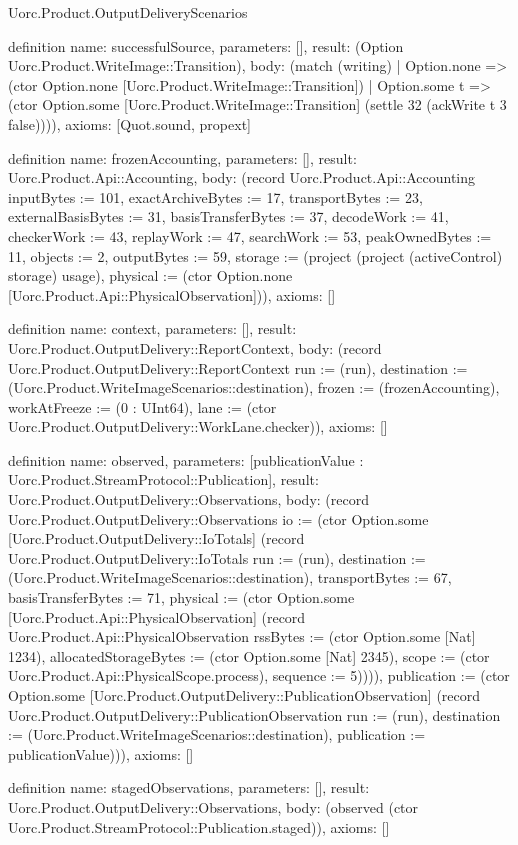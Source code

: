 \begin{lexlean}{Uorc.Product.OutputDeliveryScenarios}
\begin{semanticmodule}
definition{
  name: successfulSource,
  parameters: [],
  result: (Option Uorc.Product.WriteImage::Transition),
  body: (match (writing)
    | Option.none => (ctor Option.none [Uorc.Product.WriteImage::Transition])
    | Option.some t => (ctor Option.some [Uorc.Product.WriteImage::Transition] (settle 32 (ackWrite t 3 false)))),
  axioms: [Quot.sound, propext]
}

definition{
  name: frozenAccounting,
  parameters: [],
  result: Uorc.Product.Api::Accounting,
  body: (record Uorc.Product.Api::Accounting {inputBytes := 101, exactArchiveBytes := 17, transportBytes := 23, externalBasisBytes := 31, basisTransferBytes := 37, decodeWork := 41, checkerWork := 43, replayWork := 47, searchWork := 53, peakOwnedBytes := 11, objects := 2, outputBytes := 59, storage := (project (project (activeControl) storage) usage), physical := (ctor Option.none [Uorc.Product.Api::PhysicalObservation])}),
  axioms: []
}

definition{
  name: context,
  parameters: [],
  result: Uorc.Product.OutputDelivery::ReportContext,
  body: (record Uorc.Product.OutputDelivery::ReportContext {run := (run), destination := (Uorc.Product.WriteImageScenarios::destination), frozen := (frozenAccounting), workAtFreeze := (0 : UInt64), lane := (ctor Uorc.Product.OutputDelivery::WorkLane.checker)}),
  axioms: []
}

definition{
  name: observed,
  parameters: [publicationValue : Uorc.Product.StreamProtocol::Publication],
  result: Uorc.Product.OutputDelivery::Observations,
  body: (record Uorc.Product.OutputDelivery::Observations {io := (ctor Option.some [Uorc.Product.OutputDelivery::IoTotals] (record Uorc.Product.OutputDelivery::IoTotals {run := (run), destination := (Uorc.Product.WriteImageScenarios::destination), transportBytes := 67, basisTransferBytes := 71, physical := (ctor Option.some [Uorc.Product.Api::PhysicalObservation] (record Uorc.Product.Api::PhysicalObservation {rssBytes := (ctor Option.some [Nat] 1234), allocatedStorageBytes := (ctor Option.some [Nat] 2345), scope := (ctor Uorc.Product.Api::PhysicalScope.process), sequence := 5}))})), publication := (ctor Option.some [Uorc.Product.OutputDelivery::PublicationObservation] (record Uorc.Product.OutputDelivery::PublicationObservation {run := (run), destination := (Uorc.Product.WriteImageScenarios::destination), publication := publicationValue}))}),
  axioms: []
}

definition{
  name: stagedObservations,
  parameters: [],
  result: Uorc.Product.OutputDelivery::Observations,
  body: (observed (ctor Uorc.Product.StreamProtocol::Publication.staged)),
  axioms: []
}


\end{semanticmodule}
\end{lexlean}

